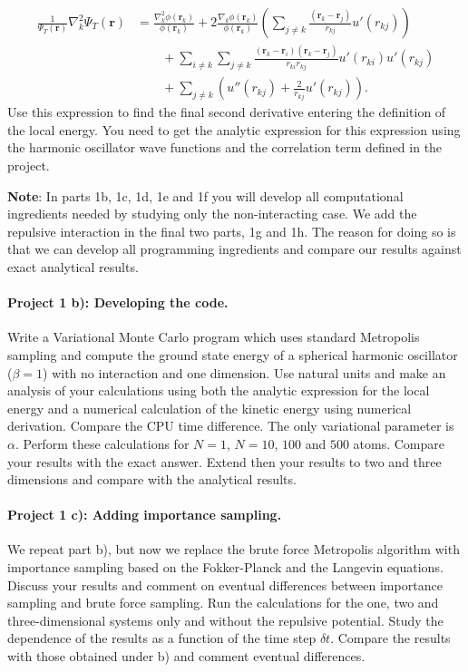 \documentclass[%
oneside,                 %
final,                   %
10pt]{article}
\begin{document}
\begin{align*}
   \frac{1}{\Psi_T(\mathbf{r})}\nabla_k^2\Psi_T(\mathbf{r})
   &= \frac{\nabla_k^2\phi(\mathbf{r}_k)}{\phi(\mathbf{r}_k)}
   + 2\frac{\nabla_k\phi(\mathbf{r}_k)}{\phi(\mathbf{r}_k)}
   \left(\sum_{j\ne k}\frac{(\mathbf{r}_k-\mathbf{r}_j)}{r_{kj}}u'(r_{kj})\right)
   \\
   &\qquad
   + \sum_{i\ne k}\sum_{j \ne k}\frac{(\mathbf{r}_k-\mathbf{r}_i)(\mathbf{r}_k-\mathbf{r}_j)}{r_{ki}r_{kj}}u'(r_{ki})u'(r_{kj})
   \\
   &\qquad
   + \sum_{j\ne k}\left( u''(r_{kj})+\frac{2}{r_{kj}}u'(r_{kj})\right).
\end{align*}
Use this expression to find the final second derivative entering the definition of the local energy. 
You need to get the analytic expression for this expression using the harmonic oscillator wave functions
and the correlation term defined in the project.

\textbf{Note}: In parts 1b, 1c, 1d, 1e and 1f you will develop all
computational ingredients needed by studying only the non-interacting
case. We add the repulsive interaction in the final two parts, 1g and
1h. The reason for doing so is that we can develop all programming
ingredients and compare our results against exact analytical results.

\paragraph{Project 1 b): Developing the code.}
Write a Variational Monte Carlo program which uses standard
   Metropolis sampling and compute the ground state energy of a
   spherical harmonic oscillator ($\beta = 1$) with no interaction and
   one dimension.  Use natural units and make an analysis of your
   calculations using both the analytic expression for the local
   energy and a numerical calculation of the kinetic energy using
   numerical derivation.  Compare the CPU time difference.  The only
   variational parameter is $\alpha$. Perform these calculations for
   $N=1$, $N=10$, $100$ and $500$ atoms. Compare your results with the
   exact answer.  Extend then your results to two and three dimensions
   and compare with the analytical results.

\paragraph{Project 1 c): Adding importance sampling.}
We repeat part b), but now we replace the brute force Metropolis algorithm with
importance sampling based on the Fokker-Planck and the Langevin equations. 
Discuss your results and comment on eventual differences between importance sampling and brute force sampling.
Run the calculations for the one, two and three-dimensional systems only and without the repulsive potential. 
Study the dependence of the results as a function of the time step $\delta t$.  
Compare the results with those obtained under b) and comment eventual differences.
\end{document}
